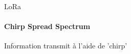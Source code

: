 \begin{frame}{LoRa}
\framesubtitle{Chirp Spread Spectrum}
\begin{block}
Information transmit à l'aide de 'chirp'
\end{block}
\begin{columns}
  \begin{column}{0.5\textwidth}
    
  \end{column}
  \begin{column}{0.5\textwidth}
    \begin{center}
    \end{center}
  \end{column}
\end{columns}
\end{frame}

